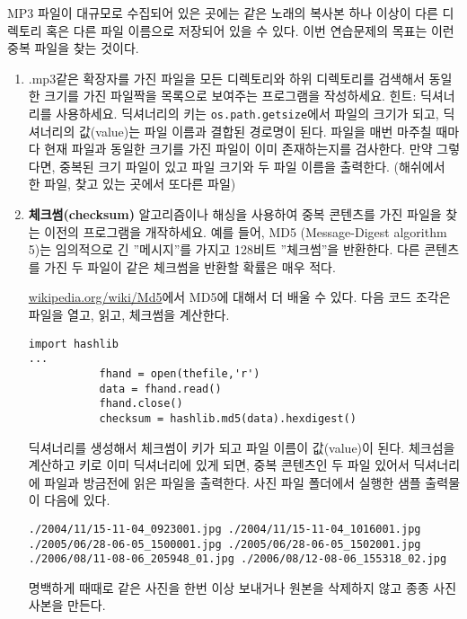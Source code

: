\begin{ex}
\label{checksum}


MP3 파일이 대규모로 수집되어 있은 곳에는 같은 노래의 복사본 하나 이상이 다른 디렉토리 혹은 다른 파일 이름으로 저장되어 있을 수 있다.
이번 연습문제의 목표는 이런 중복 파일을 찾는 것이다.

\begin{enumerate}

\item .mp3같은 확장자를 가진 파일을 모든 디렉토리와 하위 디렉토리를 검색해서 동일한 크기를 가진 파일짝을 목록으로 보여주는 프로그램을 작성하세요.
힌트: 딕셔너리를 사용하세요. 
딕셔너리의 키는 {\tt  os.path.getsize}에서 파일의 크기가 되고, 
딕셔너리의 값(value)는 파일 이름과 결합된 경로명이 된다. 
파일을 매번 마주칠 때마다 현재 파일과 동일한 크기를 가진 파일이 이미 존재하는지를 검사한다.
만약 그렇다면, 중복된 크기 파일이 있고 파일 크기와 두 파일 이름을 출력한다. (해쉬에서 한 파일, 찾고 있는 곳에서 또다른 파일)


\item {\bf 체크썸(checksum)} 알고리즘이나 해싱을 사용하여 중복 콘텐츠를 가진 파일을 찾는 이전의 프로그램을 개작하세요.
예를 들어, MD5 (Message-Digest algorithm 5)는 임의적으로 긴 ''메시지''를 가지고 128비트 ''체크썸''을 반환한다.
다른 콘텐츠를 가진 두 파일이 같은 체크썸을 반환할 확률은 매우 적다.

\url{wikipedia.org/wiki/Md5}에서 MD5에 대해서 더 배울 수 있다. 
다음 코드 조각은 파일을 열고, 읽고, 체크썸을 계산한다.

\beforeverb
\begin{verbatim}
import hashlib 
...
           fhand = open(thefile,'r')
           data = fhand.read()
           fhand.close()
           checksum = hashlib.md5(data).hexdigest()
\end{verbatim}
\afterverb
%

딕셔너리를 생성해서 체크썸이 키가 되고  파일 이름이 값(value)이 된다.
체크섬을 계산하고 키로 이미 딕셔너리에 있게 되면, 중복 콘텐츠인 두 파일 있어서
딕셔너리에 파일과 방금전에 읽은 파일을 출력한다. 
사진 파일 폴더에서 실행한 샘플 출력물이 다음에 있다.

\beforeverb
\begin{verbatim}
./2004/11/15-11-04_0923001.jpg ./2004/11/15-11-04_1016001.jpg
./2005/06/28-06-05_1500001.jpg ./2005/06/28-06-05_1502001.jpg
./2006/08/11-08-06_205948_01.jpg ./2006/08/12-08-06_155318_02.jpg
\end{verbatim}
\afterverb
%

명백하게 때때로 같은 사진을 한번 이상 보내거나 원본을 삭제하지 않고 종종 사진 사본을 만든다.

\end{enumerate}

\end{ex}

